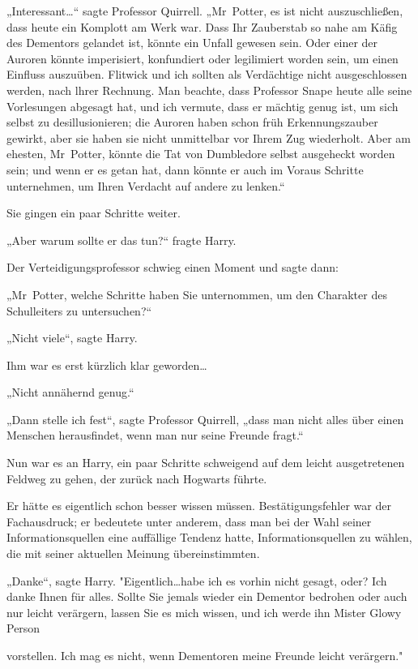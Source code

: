 {„Interessant…“ sagte Professor Quirrell. „Mr~Potter, es ist nicht auszuschließen, dass heute ein Komplott am Werk war. Dass Ihr Zauberstab so nahe am Käfig des Dementors gelandet ist, könnte ein Unfall gewesen sein. Oder einer der Auroren könnte imperisiert, konfundiert oder legilimiert worden sein, um einen Einfluss auszuüben. Flitwick und ich sollten als Verdächtige nicht ausgeschlossen werden, nach lhrer Rechnung. Man beachte, dass Professor Snape heute alle seine Vorlesungen abgesagt hat, und ich vermute, dass er mächtig genug ist, um sich selbst zu desillusionieren; die Auroren haben schon früh Erkennungszauber gewirkt, aber sie haben sie nicht unmittelbar vor Ihrem Zug wiederholt. Aber am ehesten, Mr~Potter, könnte die Tat von Dumbledore selbst ausgeheckt worden sein; und wenn er es getan hat, dann könnte er auch im Voraus Schritte unternehmen, um Ihren Verdacht auf andere zu lenken.“

Sie gingen ein paar Schritte weiter.

„Aber warum sollte er das tun?“ fragte Harry.

Der Verteidigungsprofessor schwieg einen Moment und sagte dann:

„Mr~Potter, welche Schritte haben Sie unternommen, um den Charakter des Schulleiters zu untersuchen?“

„Nicht viele“, sagte Harry.

Ihm war es erst kürzlich klar geworden…

„Nicht annähernd genug.“

„Dann stelle ich fest“, sagte Professor Quirrell, „dass man nicht alles über einen Menschen herausfindet, wenn man nur seine Freunde fragt.“

Nun war es an Harry, ein paar Schritte schweigend auf dem leicht ausgetretenen Feldweg zu gehen, der zurück nach Hogwarts führte.

Er hätte es eigentlich schon besser wissen müssen. Bestätigungsfehler war der Fachausdruck; er bedeutete unter anderem, dass man bei der Wahl seiner Informationsquellen eine auffällige Tendenz hatte, Informationsquellen zu wählen, die mit seiner aktuellen Meinung übereinstimmten.

„Danke“, sagte Harry. "Eigentlich…habe ich es vorhin nicht gesagt, oder? Ich danke Ihnen für alles. Sollte Sie jemals wieder ein Dementor bedrohen oder auch nur leicht verärgern, lassen Sie es mich wissen, und ich werde ihn Mister Glowy Person

vorstellen. Ich mag es nicht, wenn Dementoren meine Freunde leicht verärgern."

}
